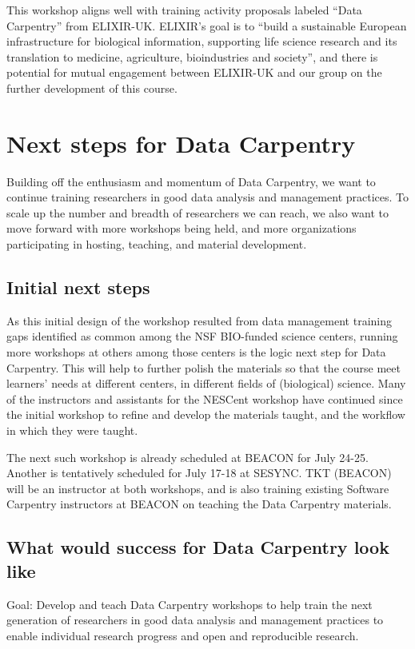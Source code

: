 \documentclass[11pt]{article}
\begin{document}
This workshop aligns well with training activity proposals labeled ``Data Carpentry'' from ELIXIR-UK. ELIXIR's goal is to ``build a sustainable European infrastructure for biological information, supporting life science research and its translation to medicine, agriculture, bioindustries and society'', and there is potential for mutual engagement between ELIXIR-UK and our group on the further development of this course. 

\section{Next steps for Data Carpentry}

Building off the enthusiasm and momentum of Data Carpentry, we want to continue training researchers in good data analysis and management practices. To scale up the number and breadth of researchers we can reach, we also want to move forward with more workshops being held, and more organizations participating in hosting, teaching, and material development.

\subsection{Initial next steps}

As this initial design of the workshop resulted from data management training gaps identified as common among the NSF BIO-funded science centers, running more workshops at others among those centers is the logic next step for Data Carpentry. This will help to further polish the materials so that the course meet learners' needs at different centers, in different fields of (biological) science. Many of the instructors and assistants for the NESCent workshop have continued since the initial workshop to refine and develop the materials taught, and the workflow in which they were taught.

The next such workshop is already scheduled at BEACON for July 24-25. Another is tentatively scheduled for July 17-18 at SESYNC. TKT (BEACON) will be an instructor at both workshops, and is also training existing Software Carpentry instructors at BEACON on teaching the Data Carpentry materials.

\subsection{What would success for Data Carpentry look like}

\hangindent=0.7cm Goal: Develop and teach Data Carpentry workshops to help train the next generation of researchers in good data analysis and management practices to enable individual research progress and open and reproducible research. 
\end{document}
